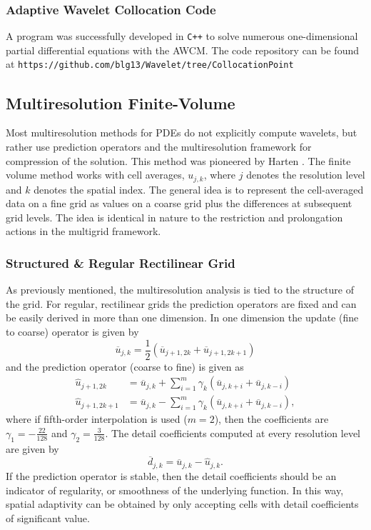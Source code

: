 \documentclass[10.5pt]{article}
\begin{document}
\subsubsection*{Adaptive Wavelet Collocation Code}
A program was successfully developed in \texttt{C++} to solve numerous one-dimensional partial differential equations with the AWCM.
The code repository can be found at \texttt{https://github.com/blg13/Wavelet/tree/CollocationPoint} 

\subsection*{Multiresolution Finite-Volume}
Most multiresolution methods for PDEs do not explicitly compute wavelets, but rather use prediction operators and the multiresolution
framework for compression of the solution. This method was pioneered by Harten \cite{Harten}. The finite volume method works with cell
averages, $u_{j,k}$, where $j$ denotes the resolution level and $k$ denotes the spatial index. The general idea is to 
represent the cell-averaged data on a fine grid as values on a coarse grid plus the differences at subsequent grid levels. The idea
is identical in nature to the restriction and prolongation actions in the multigrid framework. 

\subsubsection*{Structured \& Regular Rectilinear Grid} 
As previously mentioned, the multiresolution analysis is tied to the structure of the grid. For regular, rectilinear grids
the prediction operators are fixed and can be easily derived in more than one dimension. In one dimension the update (fine
to coarse) operator is given by
\begin{equation}
\overline{u}_{j,k} = \frac{1}{2} ( \overline{u}_{j+1,2k} + \overline{u}_{j+1,2k+1} )
\end{equation}
and the prediction operator (coarse to fine) is given as
\begin{align}
\hat{u}_{j+1,2k} & = \overline{u}_{j,k} + \sum_{i=1}^{m} \gamma_k ( \overline{u}_{j,k+i} + \overline{u}_{j,k-i} ) \\
\hat{u}_{j+1,2k+1} & = \overline{u}_{j,k} - \sum_{i=1}^{m} \gamma_k ( \overline{u}_{j,k+i} + \overline{u}_{j,k-i} ),
\end{align}
where if fifth-order interpolation is used ($m=2$), then the coefficients are $\gamma_1=-\frac{22}{128}$ and $\gamma_2=\frac{3}{128}$.
The detail coefficients computed at every resolution level are given by
\begin{equation}
\overline{d}_{j,k} = \overline{u}_{j,k} - \hat{u}_{j,k}.
\end{equation}
If the prediction operator is stable, then the detail coefficients should be an indicator of regularity, or smoothness of the underlying
function. In this way, spatial adaptivity can be obtained by only accepting cells with detail coefficients of significant value.
\end{document}
